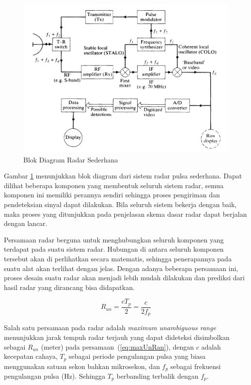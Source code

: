 \begin{figure}
	\begin{center}
		\includegraphics[scale=0.3]{pics/bab2/blokdiagram.png} 
		\caption[Blok Diagram Radar]{{Blok Diagram Radar Sederhana \cite{Kingsley1999}}}
		\label{pic:blokdiagram}
	\end{center}
\end{figure}

Gambar \ref{pic:blokdiagram} menunjukkan blok diagram dari sistem radar pulsa sederhana. Dapat dilihat beberapa komponen yang membentuk seluruh sistem radar, semua komponen ini memiliki perannya sendiri sehingga proses pengiriman dan pendeteksian sinyal dapat dilakukan.  Bila seluruh sistem bekerja dengan baik, maka proses yang ditunjukkan pada penjelasan skema dasar radar dapat berjalan dengan lancar.

Persamaan radar berguna untuk menghubungkan seluruh komponen yang terdapat pada suatu sistem radar. Hubungan di antara seluruh komponen tersebut akan di perlihatkan secara matematis, sehingga penerapannya pada suatu alat akan terlihat dengan jelas. Dengan adanya beberapa persamaan ini, proses desain suatu radar akan menjadi lebih mudah dilakukan dan prediksi dari hasil radar yang dirancang bisa didapatkan.

\begin{equation}
	R_{un} = \frac{cT_{p}}{2} = \frac{c}{2f_{p}}
	\label{eq:maxUnRan}
\end{equation}

Salah satu persamaan pada radar adalah \textit{maximum unambiguous range} menunjukkan jarak tempuh radar terjauh yang dapat dideteksi disimbolkan sebagai $R_{un}$ (meter) pada persamaan~(\ref{eq:maxUnRan}), dengan $c$ adalah kecepatan cahaya, $T_{p}$ sebagai periode pengulangan pulsa yang biasa menggunakan satuan sekon bahkan mikrosekon, dan $f_{p}$ sebagai frekuensi pengulangan pulsa (Hz). Sehingga $T_{p}$ berbanding terbalik dengan $f_{p}$.

